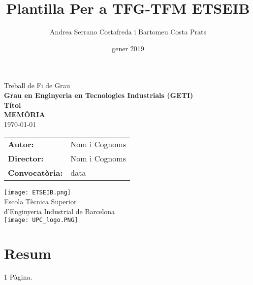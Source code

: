 \documentclass[a4paper,11pt, titlepage, twoside]{article}
\title{Plantilla Per a TFG-TFM ETSEIB}
\author{Andrea Serrano Costafreda i Bartomeu Costa Prats }
\date{gener 2019}
\begin{document}
\renewcommand{\refname}{Bibliografia}
\begin{titlepage}
    {\centering
    {\Huge Treball de Fi de Grau}\\
    \vspace{5mm}
    {\Large \textbf{Grau en Enginyeria en Tecnologies Industrials (GETI)}}\\
    \vspace{20mm}
    \Huge \textbf{Títol}\\
    \vspace{10mm}
    \Huge\textbf{MEMÒRIA}\\
    \vspace{3mm}
    \Large\today\\  %
    }
    \vspace{20mm}
    \hspace{2mm}
    \begin{tabular}{l@{ } l}
        \vspace{5mm}
        \Large \textbf{Autor:} & \Large{Nom i Cognoms} \\
        \vspace{5mm}
        \Large\textbf{Director:} & \Large{Nom i Cognoms}\\
        
         \Large\textbf{Convocatòria: } & \Large{data}\\
    \end{tabular}\par
    \vspace{10mm}
    {\centering
    \texttt{[image: ETSEIB.png]}\\
    {\Large Escola Tècnica Superior \\ d'Enginyeria Industrial de Barcelona}\\
    \vspace{3mm}
    \texttt{[image: UPC\_logo.PNG]}
    \par
    }
    \end{titlepage}

\clearpage
\thispagestyle{empty}
\null\newpage 
{}

\section*{Resum}
1 Pàgina. 
\lipsum[3-8]
\clearpage\null\newpage
\end{document}
